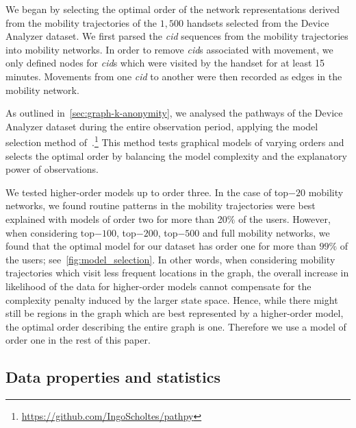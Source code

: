 We began by selecting the optimal order of the network representations derived from the mobility trajectories of the $1,500$ handsets selected from the Device Analyzer dataset.
We first parsed the \emph{cid} sequences from the mobility trajectories into mobility networks.
In order to remove \emph{cid}s associated with movement, we only defined nodes for \emph{cid}s which were visited by the handset for at least 15 minutes.
Movements from one \emph{cid} to another were then recorded as edges in the mobility network.

As outlined in~\cref{sec:graph-k-anonymity}, we analysed the pathways of the Device Analyzer dataset during the entire observation period, applying the model selection method of~\textcite{scholtes2017network}.\footnote{\url{https://github.com/IngoScholtes/pathpy}}
This method tests graphical models of varying orders and selects the optimal order by balancing the model complexity and the explanatory power of observations.

We tested higher-order models up to order three. In the case of top$-20$ mobility networks, we found routine patterns in the mobility trajectories were best explained with models of order two for more than 20$\%$ of the users. However, when considering top$-100$, top$-200$, top$-500$ and full mobility networks, we found that the optimal model for our dataset has order one for more than $ 99\% $ of the users; see~\cref{fig:model_selection}. In other words, when considering mobility trajectories which visit less frequent locations in the graph, the overall increase in likelihood of the data for higher-order models cannot compensate for the complexity penalty induced by the larger state space. Hence, while there might still be regions in the graph which are best represented by a higher-order model, the optimal order describing the entire graph is one. Therefore we use a model of order one in the rest of this paper.

\subsection{Data properties and statistics} \label{sec:data-stats}

